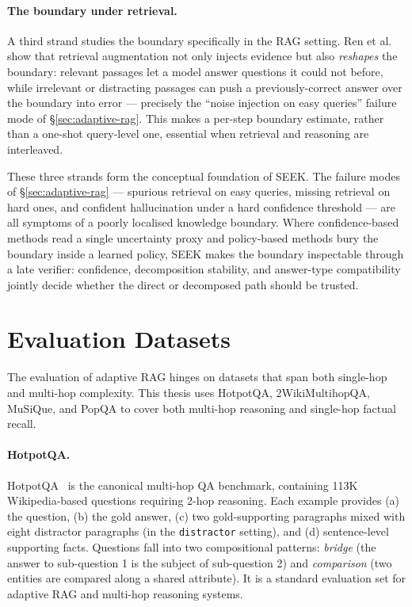 \paragraph{The boundary under retrieval.} A third strand studies the boundary specifically in the RAG setting. Ren et al.~\cite{ren2023} show that retrieval augmentation not only injects evidence but also \emph{reshapes} the boundary: relevant passages let a model answer questions it could not before, while irrelevant or distracting passages can push a previously-correct answer over the boundary into error --- precisely the ``noise injection on easy queries'' failure mode of \S\ref{sec:adaptive-rag}. This makes a per-step boundary estimate, rather than a one-shot query-level one, essential when retrieval and reasoning are interleaved.

These three strands form the conceptual foundation of SEEK. The failure modes of \S\ref{sec:adaptive-rag} --- spurious retrieval on easy queries, missing retrieval on hard ones, and confident hallucination under a hard confidence threshold --- are all symptoms of a poorly localised knowledge boundary. Where confidence-based methods read a single uncertainty proxy and policy-based methods bury the boundary inside a learned policy, SEEK makes the boundary inspectable through a late verifier: confidence, decomposition stability, and answer-type compatibility jointly decide whether the direct or decomposed path should be trusted.

\section{Evaluation Datasets}
\label{sec:evaluation-datasets}

The evaluation of adaptive RAG hinges on datasets that span both single-hop and multi-hop complexity. This thesis uses HotpotQA, 2WikiMultihopQA, MuSiQue, and PopQA to cover both multi-hop reasoning and single-hop factual recall.

\paragraph{HotpotQA.}

HotpotQA~\cite{hotpotqa} is the canonical multi-hop QA benchmark, containing 113K Wikipedia-based questions requiring 2-hop reasoning. Each example provides (a) the question, (b) the gold answer, (c) two gold-supporting paragraphs mixed with eight distractor paragraphs (in the \texttt{distractor} setting), and (d) sentence-level supporting facts. Questions fall into two compositional patterns: \emph{bridge} (the answer to sub-question 1 is the subject of sub-question 2) and \emph{comparison} (two entities are compared along a shared attribute). It is a standard evaluation set for adaptive RAG and multi-hop reasoning systems.

